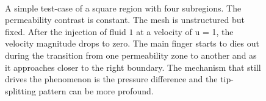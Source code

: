 \documentclass[preprint,authoryear,12pt]{elsarticle}
\begin{document}
\begin{figure}[h]
\\[0.5cm]%
%
\caption{A simple test-case of a square region with four subregions. The permeability contrast is constant. The mesh is unstructured but fixed. After the injection of fluid $1$ at a velocity of u = 1, the velocity magnitude drops to zero. The main finger starts to dies out during the transition from one permeability zone to another and as it approaches closer to the right boundary. The mechanism that still drives the phenomenon is the pressure difference and the tip-splitting pattern can be more profound. }
\label{fig:square}
\end{figure}
\end{document}
